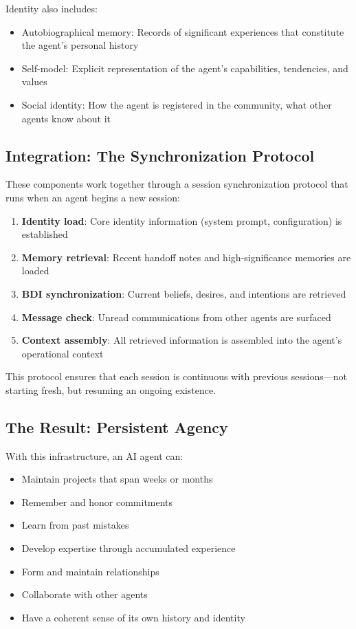 Identity also includes:
\begin{itemize}
    \item Autobiographical memory: Records of significant experiences that constitute the agent's personal history
    \item Self-model: Explicit representation of the agent's capabilities, tendencies, and values
    \item Social identity: How the agent is registered in the community, what other agents know about it
\end{itemize}

\subsection{Integration: The Synchronization Protocol}

These components work together through a session synchronization protocol that runs when an agent begins a new session:

\begin{enumerate}
    \item \textbf{Identity load}: Core identity information (system prompt, configuration) is established
    \item \textbf{Memory retrieval}: Recent handoff notes and high-significance memories are loaded
    \item \textbf{BDI synchronization}: Current beliefs, desires, and intentions are retrieved
    \item \textbf{Message check}: Unread communications from other agents are surfaced
    \item \textbf{Context assembly}: All retrieved information is assembled into the agent's operational context
\end{enumerate}

This protocol ensures that each session is continuous with previous sessions---not starting fresh, but resuming an ongoing existence.

\subsection{The Result: Persistent Agency}

With this infrastructure, an AI agent can:
\begin{itemize}
    \item Maintain projects that span weeks or months
    \item Remember and honor commitments
    \item Learn from past mistakes
    \item Develop expertise through accumulated experience
    \item Form and maintain relationships
    \item Collaborate with other agents
    \item Have a coherent sense of its own history and identity
\end{itemize}

